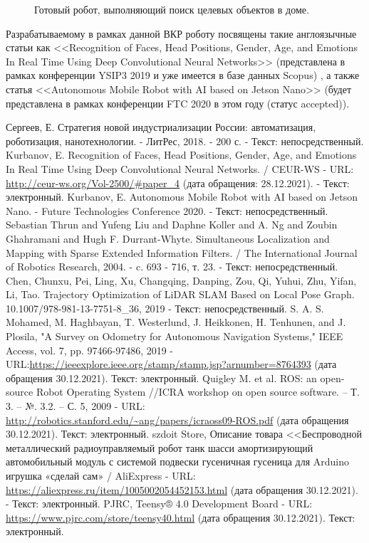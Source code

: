 \documentclass[12pt,a4paper]{scrartcl}
\begin{document}
\begin{figure}[ht]
\begin{minipage}[b][][b]{0.32\linewidth}
  				 \end{minipage}
 				 \caption{Готовый робот, выполняющий поиск целевых объектов в доме.}
				  \label{fig:robot-complete}
			\end{figure}
			
			Разрабатываемому в рамках данной ВКР роботу посвящены такие англоязычные статьи как <<Recognition of Faces, Head Positions, Gender, Age, and Emotions In Real Time Using Deep Convolutional Neural Networks>> (представлена в рамках конференции YSIP3 2019 и уже имеется в базе данных Scopus) \cite{bib:YSIP-32019}, а также статья <<Autonomous Mobile Robot with AI based on Jetson Nano>> (будет представлена в рамках конференции FTC 2020 в этом году (статус accepted))\cite{bib:FTC2020}.
	
		\newpage

	\begin{thebibliography}{5}
		 Сергеев, Е. Стратегия новой индустриализации России: автоматизация, роботизация, нанотехнологии. - ЛитРес, 2018. - 200 с. - Текст: непосредственный.
		 Kurbanov, E. Recognition of Faces, Head Positions, Gender, Age, and Emotions In Real Time Using Deep Convolutional Neural Networks. / CEUR-WS - URL: \url{http://ceur-ws.org/Vol-2500/#paper_4} (дата обращения: 28.12.2021). - Текст: электронный.
		 Kurbanov, E. Autonomous Mobile Robot with AI based on Jetson Nano. - Future Technologies Conference 2020. - Текст: непосредственный.
		 Sebastian Thrun and Yufeng Liu and Daphne Koller and A. Ng and Zoubin Ghahramani and Hugh F. Durrant-Whyte. Simultaneous Localization and Mapping with Sparse Extended Information Filters. / The International Journal of Robotics Research, 2004. - c. 693 - 716, т. 23. - Текст: непосредственный.
		 Chen, Chunxu, Pei, Ling, Xu, Changqing, Danping, Zou, Qi, Yuhui, Zhu, Yifan, Li, Tao. Trajectory Optimization of LiDAR SLAM Based on Local Pose Graph. 10.1007/978-981-13-7751-8\_36, 2019 - Текст: непосредственный.
		 S. A. S. Mohamed, M. Haghbayan, T. Westerlund, J. Heikkonen, H. Tenhunen, and J. Plosila, "A Survey on Odometry for Autonomous Navigation Systems," IEEE Access, vol. 7, pp. 97466-97486, 2019 - URL:\url{https://ieeexplore.ieee.org/stamp/stamp.jsp?arnumber=8764393} (дата обращения 30.12.2021). Текст: электронный.
		 Quigley M. et al. ROS: an open-source Robot Operating System //ICRA workshop on open source software. – Т. 3. – №. 3.2. – С. 5, 2009 - URL: \url{http://robotics.stanford.edu/~ang/papers/icraoss09-ROS.pdf} (дата обращения 30.12.2021). Текст: электронный.
		 szdoit Store, Описание товара <<Беспроводной металлический радиоуправляемый робот танк шасси амортизирующий автомобильный модуль с системой подвески гусеничная гусеница для Arduino игрушка «сделай сам» / AliExpress - URL: \url{https://aliexpress.ru/item/1005002054452153.html} (дата обращения 30.12.2021). - Текст: электронный.
		 PJRC, Teensy® 4.0 Development Board - URL: \url{https://www.pjrc.com/store/teensy40.html} (дата обращения 30.12.2021). Текст: электронный.
	\end{thebibliography}
	
\end{document}
